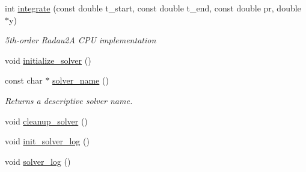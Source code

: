 \begin{DoxyCompactItemize}
int \hyperlink{namespaceradau2a_a978f385afc7643435035b4b4f198dc77}{integrate} (const double t\+\_\+start, const double t\+\_\+end, const double pr, double $\ast$y)
\begin{DoxyCompactList}\small\item\em 5th-\/order Radau2A C\+PU implementation \end{DoxyCompactList}\item 
void \hyperlink{namespaceradau2a_ac375ae6c0a01d33d11f4760164372482}{initialize\+\_\+solver} ()
\item 
const char $\ast$ \hyperlink{namespaceradau2a_a22803dc89ea392dd54f3e6992b015d03}{solver\+\_\+name} ()
\begin{DoxyCompactList}\small\item\em Returns a descriptive solver name. \end{DoxyCompactList}\item 
void \hyperlink{namespaceradau2a_a4a7f3dc84e3ac1a21dd1d804d2793673}{cleanup\+\_\+solver} ()
\item 
void \hyperlink{namespaceradau2a_ab51ab30fb2af013ef60bc2adb30d9ffe}{init\+\_\+solver\+\_\+log} ()
\item 
void \hyperlink{namespaceradau2a_a99db8b50018b420fdf242e4094762a55}{solver\+\_\+log} ()
\end{DoxyCompactItemize}
